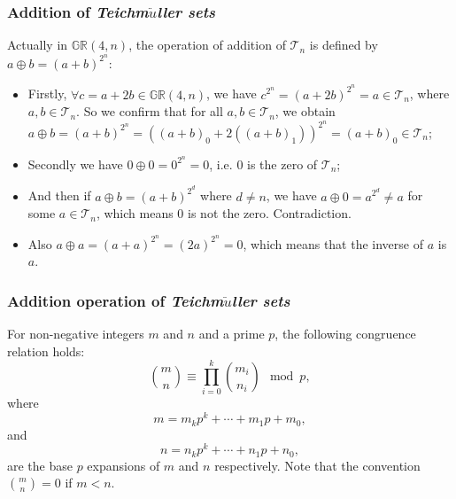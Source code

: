 \documentclass[
    aspectratio=169,                   %
]{beamer}
\newcommand{\GR}{\mathbb{GR}}
\newcommand{\teich}{\textit{Teichm$\ddot{u}$ller sets}}
\begin{document}
    \begin{frame}
        \frametitle{Addition of \teich }
    
        Actually in $\GR(4,n) $, the operation of addition of $\mathcal{T}_n$ is defined by $ a\oplus b=(a+b)^{2^n} $: 
        \begin{itemize}
            \item Firstly, $ \forall c=a+2b\in\GR(4,n) $, we have $ c^{2^n}=(a+2b)^{2^n}=a\in \mathcal{T}_n $, where $ a,b\in \mathcal{T}_n $. So we confirm that for all $ a,b\in\mathcal{T}_n $, we obtain $ a\oplus b=(a+b)^{2^n}=((a+b)_0+2((a+b)_1))^{2^n}=(a+b)_0\in\mathcal{T}_n $;
            
            \item Secondly we have $ 0\oplus 0=0^{2^n}=0 $, i.e. $ 0 $ is the zero of $ \mathcal{T}_n $;
            
            \item And then if $ a\oplus b=(a+b)^{2^d} $ where $ d\neq n $, we have $ a\oplus 0=a^{2^d}\neq a $ for some $ a\in\mathcal{T}_n $, which means $ 0 $ is not the zero.
            Contradiction.

            \item Also $ a\oplus a=(a+a)^{2^n}=(2a)^{2^n}=0 $, which means that the inverse of $ a $ is $ a $.
            
        \end{itemize}
    \end{frame}
\begin{frame}
    \frametitle{Addition operation of \teich}

    \begin{theorem}
        For non-negative integers $m$ and $n$ and a prime $p$, the following congruence relation holds:
        \[\binom{m}{n}\equiv\prod_{i=0}^k\binom{m_i}{n_i} \mod{p},\]
        where 
        \[m=m_kp^k+\cdots+m_1p+m_0,\]
        and 
        \[n=n_kp^k+\cdots+n_1p+n_0,\]
        are the base $ p $ expansions of $ m $ and $ n $ respectively. Note that the convention $ \binom{m}{n}=0 $ if $ m<n $.
    \end{theorem}

\end{frame}
\end{document}
